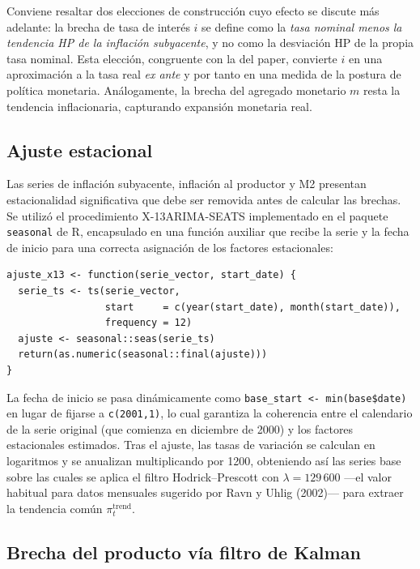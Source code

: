 \documentclass[11pt,letterpaper]{article}
\begin{document}
Conviene resaltar dos elecciones de construcción cuyo efecto se discute más adelante:
la brecha de tasa de interés $i$ se define como la \textit{tasa nominal menos la tendencia HP de la inflación subyacente}, y no como la desviación HP de la propia tasa nominal. Esta elección, congruente con la del paper, convierte $i$ en una aproximación a la tasa real \textit{ex ante} y por tanto en una medida de la postura de política monetaria. Análogamente, la brecha del agregado monetario $m$ resta la tendencia inflacionaria, capturando expansión monetaria real.

\subsection{Ajuste estacional}

Las series de inflación subyacente, inflación al productor y M2 presentan estacionalidad significativa que debe ser removida antes de calcular las brechas. Se utilizó el procedimiento X-13ARIMA-SEATS implementado en el paquete \texttt{seasonal} de \textsf{R}, encapsulado en una función auxiliar que recibe la serie y la fecha de inicio para una correcta asignación de los factores estacionales:

\begin{lstlisting}[style=rstyle, caption={Función de ajuste estacional dinámica (\texttt{0Proc\_data.R})}]
ajuste_x13 <- function(serie_vector, start_date) {
  serie_ts <- ts(serie_vector,
                 start     = c(year(start_date), month(start_date)),
                 frequency = 12)
  ajuste <- seasonal::seas(serie_ts)
  return(as.numeric(seasonal::final(ajuste)))
}
\end{lstlisting}

La fecha de inicio se pasa dinámicamente como \texttt{base\_start <- min(base\$date)} en lugar de fijarse a \texttt{c(2001,1)}, lo cual garantiza la coherencia entre el calendario de la serie original (que comienza en diciembre de 2000) y los factores estacionales estimados. Tras el ajuste, las tasas de variación se calculan en logaritmos y se anualizan multiplicando por 1200, obteniendo así las series base sobre las cuales se aplica el filtro Hodrick--Prescott con $\lambda = 129\,600$ —el valor habitual para datos mensuales sugerido por Ravn y Uhlig (2002)— para extraer la tendencia común $\pi^{\text{trend}}_t$.

\subsection{Brecha del producto vía filtro de Kalman}
\end{document}
